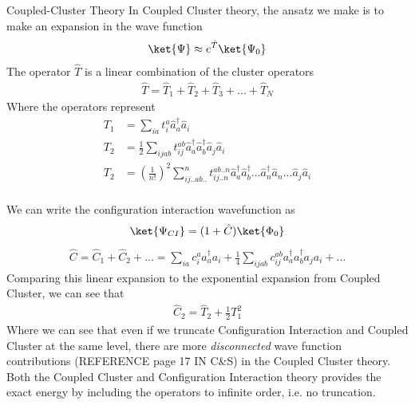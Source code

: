 \documentclass[twoside,english]{uiofysmaster}
\begin{document}
\begin{chapter}{Coupled-Cluster Theory}
 	In Coupled Cluster theory, the ansatz we make is to make an expansion in the wave function
 	\begin{align}
 		\ket{\Psi} \approx e^{\hat T} \ket{\Psi_0}
  	\end{align}
  	The operator $\hat T$ is a linear combination of the cluster operators
  	\begin{align}
  		\hat T = \hat T_1 + \hat T_2 + \hat T_3 + ... + \hat T_N
  	\end{align}
  	Where the operators represent
  	\begin{align}
  		T_1 &= \sum_{ia} t_i^a \hat a_a^{\dagger} \hat a_i \\
  		T_2 &= \frac{1}{2} \sum_{ijab} t_{ij}^{ab} \hat a_a^{\dagger}\hat a_b^{\dagger} \hat a_j \hat a_i \\
  		T_2 &= \left(\frac{1}{n!}\right)^2 \sum_{ij..ab..}^n t_{ij..n}^{ab..n} \hat a_a^{\dagger}\hat a_b^{\dagger} ...\hat a_n^{\dagger} \hat a_n ... \hat a_j \hat a_i \\
  	\end{align}

  	We can write the configuration interaction wavefunction as 
  	\begin{align}
  		\ket{\Psi_{CI}} = (1 + \hat C) \ket{\Phi_0} 
   	\end{align}
  	\begin{align}
  		\hat C = \hat C_1 + \hat C_2 + ... =  \sum_{ia} c_i^a a_a^{\dagger} a_i + \frac{1}{4} \sum_{ijab} c_{ij}^{ab} a_a^{\dagger} a_b^{\dagger} a_j a_i + ...
   	\end{align}
   	Comparing this linear expansion to the exponential expansion from Coupled Cluster, we can see that
   	\begin{align}
   		\hat C_2 = \hat T_2 + \frac{1}{2} T_1^2
   	\end{align}
   	Where we can see that even if we truncate Configuration Interaction and Coupled Cluster at the same level, there are more \textit{disconnected} wave function contributions (REFERENCE page 17 IN C\&S) in the Coupled Cluster theory. Both the Coupled Cluster and Configuration Interaction theory provides the exact energy by including the operators to infinite order, i.e. no truncation. 


\end{chapter}
\end{document}
